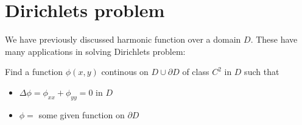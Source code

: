 \section{Dirichlets problem}\par
\noindent We have previously discussed harmonic function over a domain $D$. These have many applications in solving Dirichlets problem:
\par\bigskip
 Find a function $\phi(x,y)$ continous on $D\cup\partial D$ of class $C^2$ in $D$ such that\par
 \begin{itemize}
   \item$\Delta\phi = \phi_{xx}+\phi_{yy} =0$ in $D$
   \item $\phi = $ some given function on $\partial D$ 
 \end{itemize}
\par\bigskip
